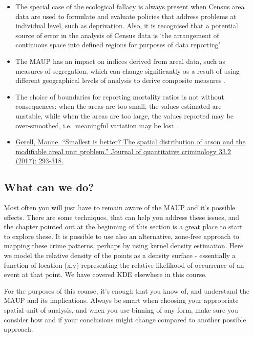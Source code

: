 \documentclass[]{book}
\providecommand{\tightlist}{%
  \setlength{\itemsep}{0pt}\setlength{\parskip}{0pt}}
\begin{document}
\begin{itemize}
\tightlist
\item
  The special case of the ecological fallacy is always present when Census area data are used to formulate and evaluate policies that address problems at individual level, such as deprivation. Also, it is recognised that a potential source of error in the analysis of Census data is `the arrangement of continuous space into defined regions for purposes of data reporting'
\item
  The MAUP has an impact on indices derived from areal data, such as measures of segregation, which can change significantly as a result of using different geographical levels of analysis to derive composite measures .
\item
  The choice of boundaries for reporting mortality ratios is not without consequences: when the areas are too small, the values estimated are unstable, while when the areas are too large, the values reported may be over-smoothed, i.e.~meaningful variation may be lost .
\item
  \href{https://link.springer.com/article/10.1007/s10940-016-9297-6}{Gerell, Manne. ``Smallest is better? The spatial distribution of arson and the modifiable areal unit problem.'' Journal of quantitative criminology 33.2 (2017): 293-318.}
\end{itemize}

\hypertarget{what-can-we-do}{%
\subsection{What can we do?}\label{what-can-we-do}}

Most often you will just have to remain aware of the MAUP and it's possible effects. There are some techniques, that can help you address these issues, and the chapter pointed out at the beginning of this section is a great place to start to explore these. It is possible to use also an alternative, zone-free approach to mapping these crime patterns, perhaps by using kernel density estimation. Here we model the relative density of the points as a density surface - essentially a function of location (x,y) representing the relative likelihood of occurrence of an event at that point. We have covered KDE elsewhere in this course.

For the purposes of this course, it's enough that you know of, and understand the MAUP and its implications. Always be smart when choosing your appropriate spatial unit of analysis, and when you use binning of any form, make sure you consider how and if your conclusions might change compared to another possible approach.
\end{document}
